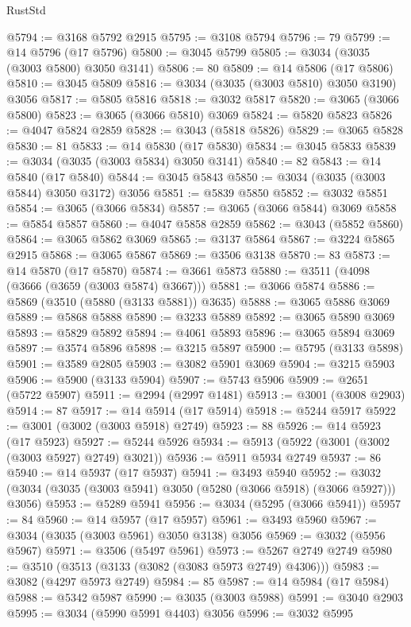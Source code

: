 \begin{lexlean}{RustStd}
\begin{coremodule}
@5794 := @3168 @5792 @2915
@5795 := @3108 @5794
@5796 := 79
@5799 := @14 @5796 (@17 @5796)
@5800 := @3045 @5799
@5805 := @3034 (@3035 (@3003 @5800) @3050 @3141)
@5806 := 80
@5809 := @14 @5806 (@17 @5806)
@5810 := @3045 @5809
@5816 := @3034 (@3035 (@3003 @5810) @3050 @3190) @3056
@5817 := @5805 @5816
@5818 := @3032 @5817
@5820 := @3065 (@3066 @5800)
@5823 := @3065 (@3066 @5810) @3069
@5824 := @5820 @5823
@5826 := @4047 @5824 @2859
@5828 := @3043 (@5818 @5826)
@5829 := @3065 @5828
@5830 := 81
@5833 := @14 @5830 (@17 @5830)
@5834 := @3045 @5833
@5839 := @3034 (@3035 (@3003 @5834) @3050 @3141)
@5840 := 82
@5843 := @14 @5840 (@17 @5840)
@5844 := @3045 @5843
@5850 := @3034 (@3035 (@3003 @5844) @3050 @3172) @3056
@5851 := @5839 @5850
@5852 := @3032 @5851
@5854 := @3065 (@3066 @5834)
@5857 := @3065 (@3066 @5844) @3069
@5858 := @5854 @5857
@5860 := @4047 @5858 @2859
@5862 := @3043 (@5852 @5860)
@5864 := @3065 @5862 @3069
@5865 := @3137 @5864
@5867 := @3224 @5865 @2915
@5868 := @3065 @5867
@5869 := @3506 @3138
@5870 := 83
@5873 := @14 @5870 (@17 @5870)
@5874 := @3661 @5873
@5880 := @3511 (@4098 (@3666 (@3659 (@3003 @5874) @3667)))
@5881 := @3066 @5874
@5886 := @5869 (@3510 (@5880 (@3133 @5881)) @3635)
@5888 := @3065 @5886 @3069
@5889 := @5868 @5888
@5890 := @3233 @5889
@5892 := @3065 @5890 @3069
@5893 := @5829 @5892
@5894 := @4061 @5893
@5896 := @3065 @5894 @3069
@5897 := @3574 @5896
@5898 := @3215 @5897
@5900 := @5795 (@3133 @5898)
@5901 := @3589 @2805
@5903 := @3082 @5901 @3069
@5904 := @3215 @5903
@5906 := @5900 (@3133 @5904)
@5907 := @5743 @5906
@5909 := @2651 (@5722 @5907)
@5911 := @2994 (@2997 @1481)
@5913 := @3001 (@3008 @2903)
@5914 := 87
@5917 := @14 @5914 (@17 @5914)
@5918 := @5244 @5917
@5922 := @3001 (@3002 (@3003 @5918) @2749)
@5923 := 88
@5926 := @14 @5923 (@17 @5923)
@5927 := @5244 @5926
@5934 := @5913 (@5922 (@3001 (@3002 (@3003 @5927) @2749) @3021))
@5936 := @5911 @5934 @2749
@5937 := 86
@5940 := @14 @5937 (@17 @5937)
@5941 := @3493 @5940
@5952 := @3032 (@3034 (@3035 (@3003 @5941) @3050 (@5280 (@3066 @5918) (@3066 @5927))) @3056)
@5953 := @5289 @5941
@5956 := @3034 (@5295 (@3066 @5941))
@5957 := 84
@5960 := @14 @5957 (@17 @5957)
@5961 := @3493 @5960
@5967 := @3034 (@3035 (@3003 @5961) @3050 @3138) @3056
@5969 := @3032 (@5956 @5967)
@5971 := @3506 (@5497 @5961)
@5973 := @5267 @2749 @2749
@5980 := @3510 (@3513 (@3133 (@3082 (@3083 @5973 @2749) @4306)))
@5983 := @3082 (@4297 @5973 @2749)
@5984 := 85
@5987 := @14 @5984 (@17 @5984)
@5988 := @5342 @5987
@5990 := @3035 (@3003 @5988)
@5991 := @3040 @2903
@5995 := @3034 (@5990 @5991 @4403) @3056
@5996 := @3032 @5995

\end{coremodule}
\end{lexlean}

